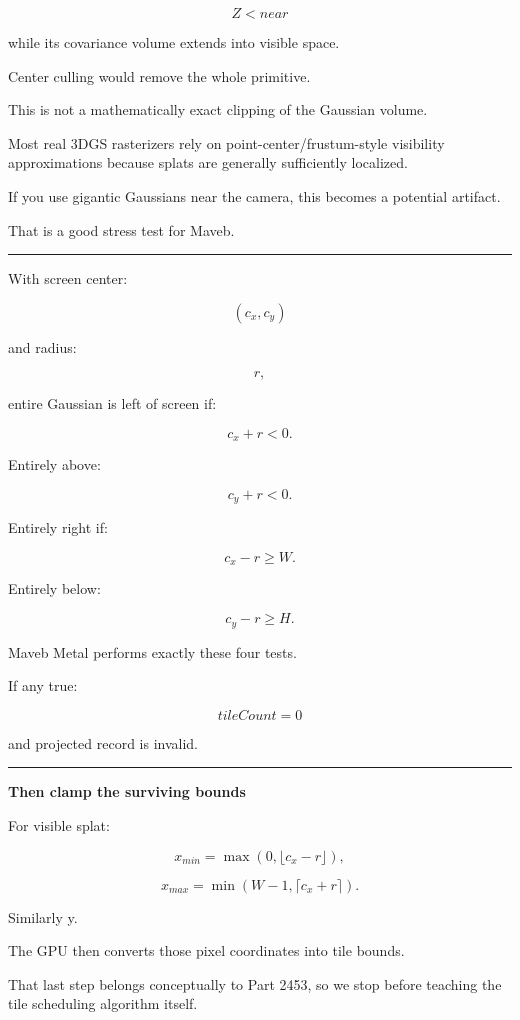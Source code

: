 \[
Z<near
\]

while its covariance volume extends into visible space.

Center culling would remove the whole primitive.

This is not a mathematically exact clipping of the Gaussian volume.

Most real 3DGS rasterizers rely on point-center/frustum-style visibility approximations because splats are generally sufficiently localized.

If you use gigantic Gaussians near the camera, this becomes a potential artifact.

That is a good stress test for Maveb.

\begin{center}\rule{0.5\linewidth}{0.5pt}\end{center}

With screen center:

\[
(c_x,c_y)
\]

and radius:

\[
r,
\]

entire Gaussian is left of screen if:

\[
c_x+r<0.
\]

Entirely above:

\[
c_y+r<0.
\]

Entirely right if:

\[
c_x-r\ge W.
\]

Entirely below:

\[
c_y-r\ge H.
\]

Maveb Metal performs exactly these four tests.

If any true:

\[
tileCount=0
\]

and projected record is invalid.

\begin{center}\rule{0.5\linewidth}{0.5pt}\end{center}

\textbf{Then clamp the surviving bounds}

For visible splat:

\[
x_{min}
=
\max(
0,
\lfloor c_x-r\rfloor
),
\]

\[
x_{max}
=
\min(
W-1,
\lceil c_x+r\rceil
).
\]

Similarly y.

The GPU then converts those pixel coordinates into tile bounds.

That last step belongs conceptually to Part 2453, so we stop before teaching the tile scheduling algorithm itself.

